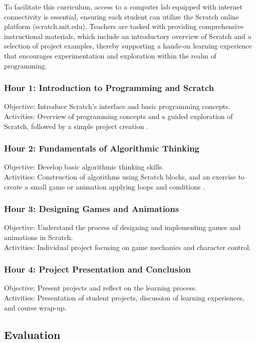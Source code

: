 \documentclass[final,5p,times,twocolumn,authoryear]{elsarticle}
\begin{document}
To facilitate this curriculum, access to a computer lab equipped with internet connectivity is essential, ensuring each student can utilize the Scratch online platform (scratch.mit.edu). Teachers are tasked with providing comprehensive instructional materials, which include an introductory overview of Scratch and a selection of project examples, thereby supporting a hands-on learning experience that encourages experimentation and exploration within the realm of programming.

\subsubsection{Hour 1: Introduction to Programming and Scratch}
Objective: Introduce Scratch's interface and basic programming concepts. \\
Activities: Overview of programming concepts and a guided exploration of Scratch, followed by a simple project creation \citep{resnick2009scratch}.

\subsubsection{Hour 2: Fundamentals of Algorithmic Thinking}
Objective: Develop basic algorithmic thinking skills. \\
Activities: Construction of algorithms using Scratch blocks, and an exercise to create a small game or animation applying loops and conditions \citep{maloney2010scratch}.

\subsubsection{Hour 3: Designing Games and Animations}
Objective: Understand the process of designing and implementing games and animations in Scratch. \\
Activities: Individual project focusing on game mechanics and character control.

\subsubsection{Hour 4: Project Presentation and Conclusion}
Objective: Present projects and reflect on the learning process. \\
Activities: Presentation of student projects, discussion of learning experiences, and course wrap-up.


\subsection{Evaluation}
\end{document}
